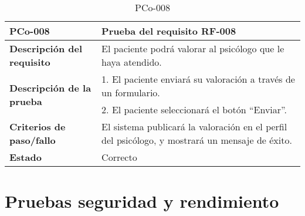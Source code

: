 \begin{table}[htpb]
\centering
\begin{tabularx}{\textwidth}{|l|X|}
\hline
\textbf{PCo-008}                                     & \textbf{Prueba del requisito RF-008}                                                           \\ \hline
\textbf{Descripción del requisito}                 & El paciente podrá valorar al psicólogo que le haya atendido.                                   \\ \hline
\multirow{2}{*}{\textbf{Descripción de la prueba}} & 1. El paciente enviará su valoración a través de un formulario.                                \\ \cline{2-2} 
                                                   & 2. El paciente seleccionará el botón ``Enviar''.
\\ \hline
\textbf{Criterios de paso/fallo}                   & El sistema publicará la valoración en el perfil del psicólogo, y mostrará un mensaje de éxito. \\ \hline
\textbf{Estado}                                    & Correcto                                                                                       \\ \hline
\end{tabularx}
\caption{PCo-008}
\end{table}

\section{Pruebas seguridad y rendimiento}


%
%
%
%
%


